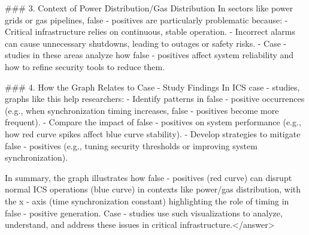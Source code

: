 ### 3. Context of Power Distribution/Gas Distribution  
In sectors like power grids or gas pipelines, false - positives are particularly problematic because:  
- Critical infrastructure relies on continuous, stable operation.  
- Incorrect alarms can cause unnecessary shutdowns, leading to outages or safety risks.  
- Case - studies in these areas analyze how false - positives affect system reliability and how to refine security tools to reduce them.  


### 4. How the Graph Relates to Case - Study Findings  
In ICS case - studies, graphs like this help researchers:  
- Identify patterns in false - positive occurrences (e.g., when synchronization timing increases, false - positives become more frequent).  
- Compare the impact of false - positives on system performance (e.g., how red curve spikes affect blue curve stability).  
- Develop strategies to mitigate false - positives (e.g., tuning security thresholds or improving system synchronization).  


In summary, the graph illustrates how false - positives (red curve) can disrupt normal ICS operations (blue curve) in contexts like power/gas distribution, with the x - axis (time synchronization constant) highlighting the role of timing in false - positive generation. Case - studies use such visualizations to analyze, understand, and address these issues in critical infrastructure.</answer>